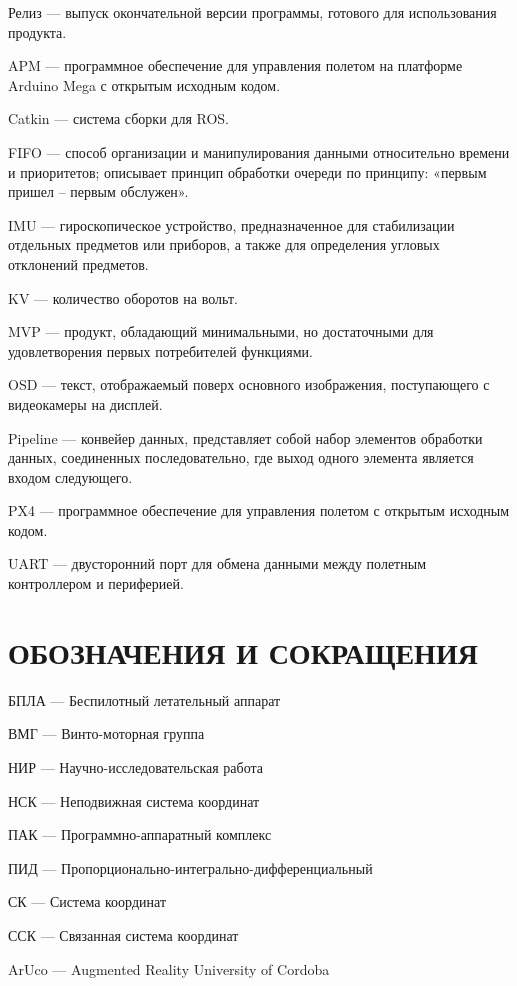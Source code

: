 \documentclass[a4paper,12pt]{article}
\begin{document}
Релиз --- выпуск окончательной версии программы, готового для использования продукта.

APM --- программное обеспечение для управления полетом на платформе Arduino Mega с открытым исходным кодом.

Catkin --- система сборки для ROS.

FIFO --- способ организации и манипулирования данными относительно времени и приоритетов; описывает принцип обработки очереди по принципу: «первым пришел -- первым обслужен».

IMU --- гироскопическое устройство, предназначенное для стабилизации отдельных предметов или приборов, а также для определения угловых отклонений предметов.

KV --- количество оборотов на вольт.

MVP --- продукт, обладающий минимальными, но достаточными для удовлетворения первых потребителей функциями.

OSD --- текст, отображаемый поверх основного изображения, поступающего с видеокамеры на дисплей.

Pipeline --- конвейер данных, представляет собой набор элементов обработки данных, соединенных последовательно, где выход одного элемента является входом следующего.

PX4 --- программное обеспечение для управления полетом с открытым исходным кодом.

UART --- двусторонний порт для обмена данными между полетным контроллером и периферией.

\pagebreak
\thispagestyle{empty}

\section*{\centering ОБОЗНАЧЕНИЯ И СОКРАЩЕНИЯ}

БПЛА --- Беспилотный летательный аппарат

ВМГ --- Винто-моторная группа

НИР --- Научно-исследовательская работа

НСК --- Неподвижная система координат

ПАК --- Программно-аппаратный комплекс

ПИД --- Пропорционально-интегрально-дифференциальный

СК --- Система координат

ССК --- Связанная система координат

ArUco --- Augmented Reality University of Cordoba
\end{document}
